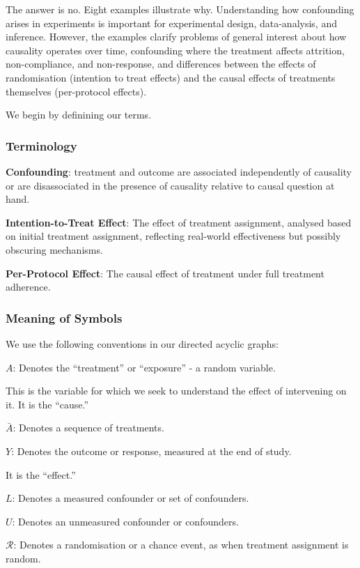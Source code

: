 \documentclass[
  single column]{article}
\begin{document}
The answer is no. Eight examples illustrate why. Understanding how
confounding arises in experiments is important for experimental design,
data-analysis, and inference. However, the examples clarify problems of
general interest about how causality operates over time, confounding
where the treatment affects attrition, non-compliance, and non-response,
and differences between the effects of randomisation (intention to treat
effects) and the causal effects of treatments themselves (per-protocol
effects).

We begin by definining our terms.

\subsubsection{Terminology}\label{terminology}

\textbf{Confounding}: treatment and outcome are associated independently
of causality or are disassociated in the presence of causality relative
to causal question at hand.

\textbf{Intention-to-Treat Effect}: The effect of treatment assignment,
analysed based on initial treatment assignment, reflecting real-world
effectiveness but possibly obscuring mechanisms.

\textbf{Per-Protocol Effect}: The causal effect of treatment under full
treatment adherence.

\subsubsection{Meaning of Symbols}\label{meaning-of-symbols}

We use the following conventions in our directed acyclic graphs:

\textbf{\(A\)}: Denotes the ``treatment'' or ``exposure'' - a random
variable.

This is the variable for which we seek to understand the effect of
intervening on it. It is the ``cause.''

\textbf{\(\bar{A}\)}: Denotes a sequence of treatments.

\textbf{\(Y\)}: Denotes the outcome or response, measured at the end of
study.

It is the ``effect.''

\textbf{\(L\)}: Denotes a measured confounder or set of confounders.

\textbf{\(U\)}: Denotes an unmeasured confounder or confounders.

\textbf{\(\mathcal{R}\)}: Denotes a randomisation or a chance event, as
when treatment assignment is random.
\end{document}
